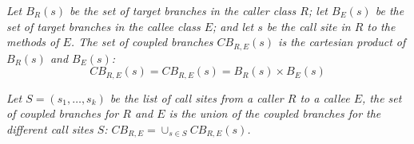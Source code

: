 \begin{definition}
\textit{
Let $B_{R}(s)$ be the set of target branches in the caller class $R$; let $B_{E}(s)$ be the set of target branches in the callee class $E$; and let $s$ be the call site in $R$ to the methods of $E$. The set of coupled branches $CB_{R,E}(s)$ is the cartesian product of $B_{R}(s)$ and $B_{E}(s)$:
}
\begin{equation}\label{def2}
	CB_{R,E}(s) = CB_{R,E}(s) = B_{R}(s) \times B_{E}(s)
\end{equation}
\end{definition}

\begin{definition}\label{def3}
\textit{
Let $S=(s_1, \dots, s_k)$ be the list of call sites from a caller $R$ to a callee $E$, the set of coupled branches for $R$ and $E$ is the union of the coupled branches for the different call sites $S$: $CB_{R,E} = \cup_{s \in S} CB_{R,E}(s)$.
}
\end{definition}

%
%
%

